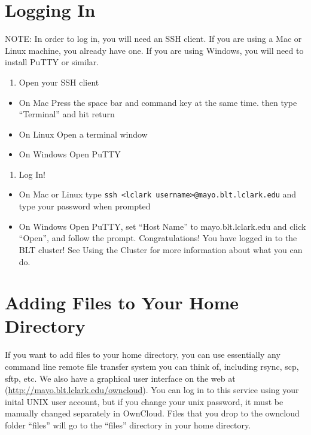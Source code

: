 \documentclass[]{book}
\providecommand{\tightlist}{%
  \setlength{\itemsep}{0pt}\setlength{\parskip}{0pt}}
\begin{document}
\section{Logging In}\label{logging-in}

NOTE: In order to log in, you will need an SSH client. If you are using
a Mac or Linux machine, you already have one. If you are using Windows,
you will need to install PuTTY or similar.

\begin{enumerate}
\def\labelenumi{\arabic{enumi}.}
\tightlist
\item
  Open your SSH client
\end{enumerate}

\begin{itemize}
\tightlist
\item
  On Mac Press the space bar and command key at the same time. then type
  ``Terminal'' and hit return
\item
  On Linux Open a terminal window
\item
  On Windows Open PuTTY
\end{itemize}

\begin{enumerate}
\def\labelenumi{\arabic{enumi}.}
\setcounter{enumi}{1}
\tightlist
\item
  Log In!
\end{enumerate}

\begin{itemize}
\tightlist
\item
  On Mac or Linux type
  \texttt{ssh\ \textless{}lclark\ username\textgreater{}@mayo.blt.lclark.edu}
  and type your password when prompted
\item
  On Windows Open PuTTY, set ``Host Name'' to mayo.blt.lclark.edu and
  click ``Open'', and follow the prompt. Congratulations! You have
  logged in to the BLT cluster! See Using the Cluster for more
  information about what you can do.
\end{itemize}

\section{Adding Files to Your Home
Directory}\label{adding-files-to-your-home-directory}

If you want to add files to your home directory, you can use essentially
any command line remote file transfer system you can think of, including
rsync, scp, sftp, etc. We also have a graphical user interface on the
web at (\url{http://mayo.blt.lclark.edu/owncloud}). You can log in to
this service using your inital UNIX user account, but if you change your
unix password, it must be manually changed separately in OwnCloud. Files
that you drop to the owncloud folder ``files'' will go to the ``files''
directory in your home directory.
\end{document}
